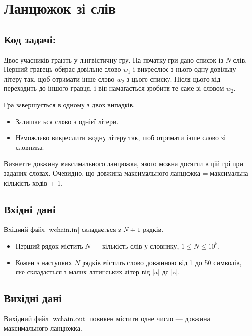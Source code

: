 \documentclass[12pt,a4paper]{article}
\begin{document}
\section*{Ланцюжок зі слів \hfill {}}


\subsection*{Код задачі: }

Двоє учасників грають у лінгвістичну гру.
На початку гри дано список із \(N\) слів. Перший гравець обирає довільне слово \(w_1\) і викреслює з нього одну довільну літеру так, щоб отримати інше слово \(w_2\) з цього списку. Після цього хід переходить до іншого гравця, і він намагається зробити те саме зі словом \(w_2\).

Гра завершується в одному з двох випадків:

\begin{itemize}
    \item Залишається слово з однієї літери.
    \item Неможливо викреслити жодну літеру так, щоб отримати інше слово зі словника.
\end{itemize}

Визначте довжину максимального ланцюжка, якого можна досягти в цій грі при заданих словах. Очевидно, що довжина максимального ланцюжка = максимальна кількість ходів + 1.


\subsection*{Вхідні дані}

Вхідний файл |wchain.in| складається з \(N + 1\) рядків.
\begin{itemize}
    \item Перший рядок містить \(N\) --- кількість слів у словнику, \(1 \leq N \leq 10^5\).
    \item Кожен з наступних \(N\) рядків містить слово довжиною від 1 до 50 символів, яке складається з малих латинських літер від |a| до |z|.
\end{itemize}


\subsection*{Вихідні дані}

Вихідний файл |wchain.out| повинен містити одне число --- довжина максимального ланцюжка.
\end{document}
